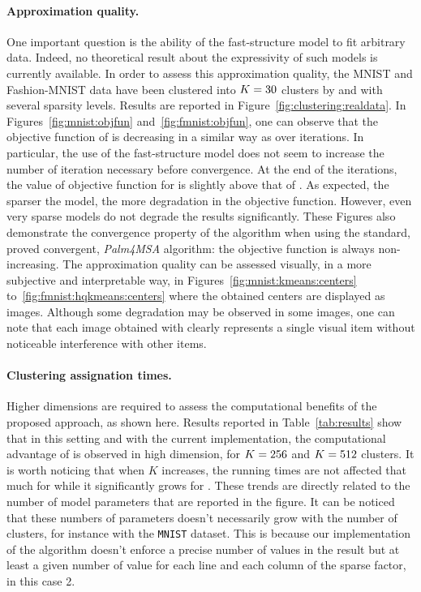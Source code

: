 \paragraph{Approximation quality.} One important question is the ability of the fast-structure model to fit arbitrary data.
Indeed, no theoretical result about the expressivity of such models is currently available.
In order to assess this approximation quality, the MNIST and Fashion-MNIST data have been clustered into $K=30$ clusters by \kmeans and \qkmeans with several sparsity levels.
Results are reported in Figure~\ref{fig:clustering:realdata}.
In Figures~\ref{fig:mnist:objfun} and~\ref{fig:fmnist:objfun}, one can observe that the objective function of \qkmeans is decreasing in a similar way as \kmeans over iterations.
In particular, the use of the fast-structure model does not seem to increase the number of iteration necessary before convergence.
At the end of the iterations, the value of objective function for \qkmeans is slightly above that of \kmeans.
As expected, the sparser the model, the more degradation in the objective function.
However, even very sparse models do not degrade the results significantly. These Figures also demonstrate the convergence property of the \qkmeans algorithm when using the standard, proved convergent, \textit{Palm4MSA} algorithm: the objective function is always non-increasing.
The approximation quality can be assessed visually, in a more subjective and interpretable way, in Figures~\ref{fig:mnist:kmeans:centers} to~\ref{fig:fmnist:hqkmeans:centers} where the obtained centers are displayed as images.
Although some degradation may be observed in some images, one can note that each image obtained with \qkmeans clearly represents a single visual item without noticeable interference with other items.

\paragraph{Clustering assignation times.}
Higher dimensions are required to assess the computational benefits of the proposed approach, as shown here.
Results reported in Table~\ref{tab:results} show that in this setting and with the current implementation, the computational advantage of \qkmeans is observed in high dimension, for $K=256$ and $K=512$ clusters. It is worth noticing that when $K$ increases, the running times are not affected that much for \qkmeans while it significantly grows for \kmeans. These trends are directly related to the number of model parameters that are reported in the figure. It can be noticed that these numbers of parameters doesn't necessarily grow with the number of clusters, for instance with the \texttt{MNIST} dataset. This is because our implementation of the \palm algorithm doesn't enforce a precise number of values in the result but at least a given number of value for each line and each column of the sparse factor, in this case 2.


